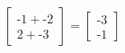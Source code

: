 \documentclass[preview]{standalone}
\begin{document}
\begin{align*}
\begin{bmatrix} \text{-}1 + \text{-}2 \\ 2 + \text{-}3 \end{bmatrix}= \begin{bmatrix} \text{-}3 \\ \text{-}1 \end{bmatrix}
\end{align*}
\end{document}
